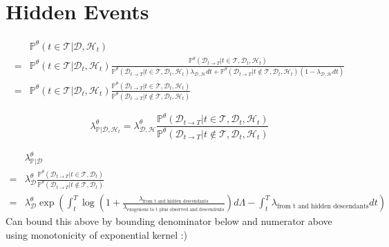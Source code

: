 \documentclass[honours,12pt]{unswthesis}
\numberwithin{equation}{section}
\begin{document}
\section{Hidden Events}
\begin{equation*}
	\begin{align}
		& \mathbb{P}^\theta(t\in\mathcal{T} \vert \mathcal{D}, \mathcal{H}_t) \\
		= & \mathbb{P}^\theta(t\in\mathcal{T}\vert \mathcal{D}_t, \mathcal{H}_t) \frac{\mathbb{P}^\theta(\mathcal{D}_{t\to T} \vert t\in\mathcal{T}, \mathcal{D}_t, \mathcal{H}_t)}{\mathbb{P}^\theta(\mathcal{D}_{t\to T} \vert t\in\mathcal{T}, \mathcal{D}_t, \mathcal{H}_t)\lambda_{\mathcal{D},\mathcal{H}}dt + \mathbb{P}^\theta(\mathcal{D}_{t\to T} \vert t\not\in\mathcal{T}, \mathcal{D}_t, \mathcal{H}_t)(1-\lambda_{\mathcal{D},\mathcal{H}}dt)} \\
		= & \mathbb{P}^\theta(t\in\mathcal{T}\vert \mathcal{D}_t, \mathcal{H}_t) \frac{\mathbb{P}^\theta(\mathcal{D}_{t\to T}\vert t\in\mathcal{T}, \mathcal{D}_t, \mathcal{H}_t)}{\mathbb{P}^\theta(\mathcal{D}_{t\to T}\vert t\not\in\mathcal{T}, \mathcal{D}_t, \mathcal{H}_t)}
	\end{align}
\end{equation*}

$$\lambda_{\mathbb{P} \vert \mathcal{D}, \mathcal{H}_t}^\theta = \lambda_{\mathcal{D},\mathcal{H}}^\theta \frac{\mathbb{P}^\theta(\mathcal{D}_{t\to T}\vert t\in\mathcal{T}, \mathcal{D}_t, \mathcal{H}_t)}{\mathbb{P}^\theta(\mathcal{D}_{t\to T}\vert t\not\in\mathcal{T}, \mathcal{D}_t, \mathcal{H}_t)}$$

\begin{equation*}
	\begin{align}
		& \lambda_{\mathbb{P} \vert \mathcal{D}}^\theta \\
		= & \lambda_{\mathcal{D}}^\theta \frac{\mathbb{P}^\theta(\mathcal{D}_{t\to T}\vert t\in\mathcal{T}, \mathcal{D}_t)}{\mathbb{P}^\theta(\mathcal{D}_{t\to T}\vert t\not\in\mathcal{T}, \mathcal{D}_t)} \\
		= & \lambda_\mathcal{D}^\theta \exp\left( \int_t^T \log\left(1 + \frac{\lambda_\text{from t and hidden descendants}}{\lambda_\text{exogenous to t plus observed and descendents}}\right) d\Lambda - \int_t^T \lambda_\text{from t and hidden descendants}dt \right)
	\end{align}
\end{equation*}
Can bound this above by bounding denominator below and numerator above using monotonicity of exponential kernel :)
\end{document}
